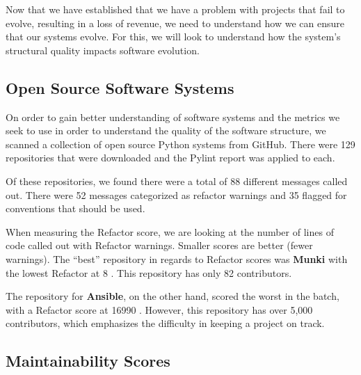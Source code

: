 \documentclass[12pt,conference]{IEEEtran}
\begin{document}
Now that we have established that we have a problem with projects that fail to evolve, resulting in a loss of revenue, we need to understand how we can ensure that our systems evolve. For this, we will look to understand how the system's structural quality impacts software evolution.

\subsection{Open Source Software Systems} \label{sectionSoftwareData}

On order to gain better understanding of software systems and the metrics we seek to use in order to understand the quality of the software structure, we scanned a collection of open source Python systems from GitHub. There were 129 repositories that were downloaded and the Pylint report was applied to each.

Of these repositories, we found there were a total of 88 different messages called out. There were 52 messages categorized as refactor warnings and 35 flagged for conventions that should be used.

When measuring the Refactor score, we are looking at the number of lines of code called out with Refactor warnings. Smaller scores are better (fewer warnings). The ``best'' repository in regards to Refactor scores was \textbf{Munki} with the lowest Refactor at 8 \cite{data:munki}. This repository has only 82 contributors.

The repository for \textbf{Ansible}, on the other hand, scored the worst in the batch, with a Refactor score at 16990 \cite{data:ansible}. However, this repository has over 5,000 contributors, which emphasizes the difficulty in keeping a project on track.


\subsection{Maintainability Scores} \label{sectionMaintainabilityScores}
\end{document}
